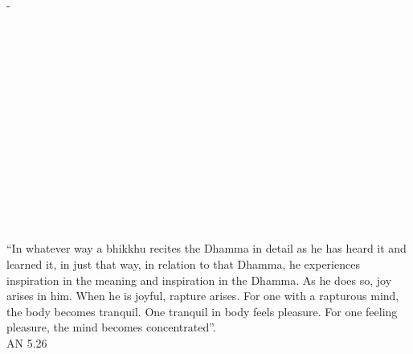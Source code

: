 \cleartorecto
\thispagestyle{empty}
-\vspace*{3em}

{\centering


  \\[1.0\baselineskip] \fi

  \\[1.0\baselineskip] \fi

  \ifafiveversion {}
    {\Huge\chapterTitleFont\textsc{{\thesubtitle\linebreak}}}\\[0.2\baselineskip] \fi

  \ifasixversion {\fontsize{18}{14}\chapterTitleFont\textsc{{\thesubtitle\linebreak}}}\\[0.2\baselineskip] \fi

  \ifafiveversion {}\\[1.4\baselineskip] \fi

  \ifasixversion {}\\[1.4\baselineskip] \fi


  \\[2.5\baselineskip] \fi

  \\[2.5\baselineskip] \fi

  {\quote ``In whatever way a bhikkhu recites the Dhamma in detail as he has heard it and learned it, in just that way, in relation to that Dhamma, he experiences inspiration in the meaning and inspiration in the Dhamma. As he does so, joy arises in him. When he is joyful, rapture arises. For one with a rapturous mind, the body becomes tranquil. One tranquil in body feels pleasure. For one feeling pleasure, the mind becomes concentrated''.\\}\ifafiveversion \smallskip \fi \ifasixversion \medskip\tiny \fi AN 5.26\\[1.4\baselineskip]
}

